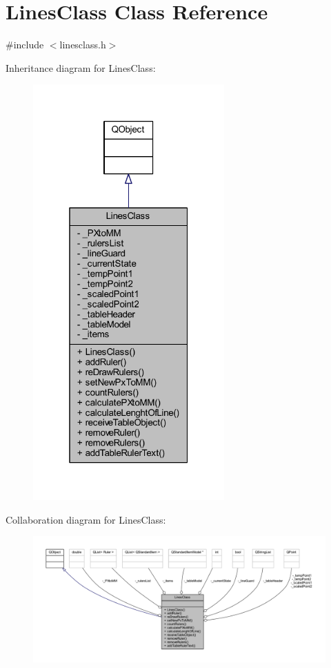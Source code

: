 \hypertarget{class_lines_class}{}\section{Lines\+Class Class Reference}
\label{class_lines_class}


{\ttfamily \#include $<$linesclass.\+h$>$}



Inheritance diagram for Lines\+Class\+:
\nopagebreak
\begin{figure}[H]
\begin{center}
\leavevmode
\includegraphics[width=208pt]{class_lines_class__inherit__graph}
\end{center}
\end{figure}


Collaboration diagram for Lines\+Class\+:
\nopagebreak
\begin{figure}[H]
\begin{center}
\leavevmode
\includegraphics[width=350pt]{class_lines_class__coll__graph}
\end{center}
\end{figure}
